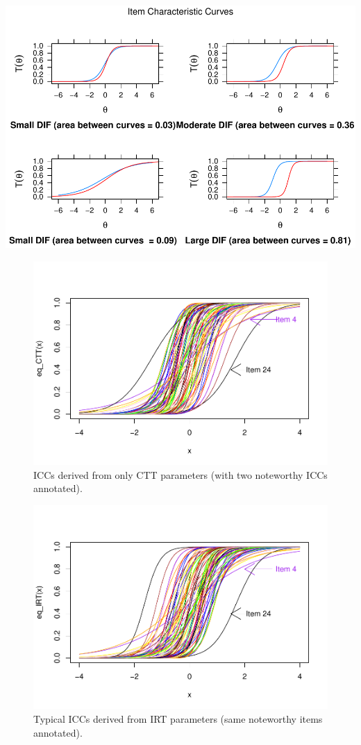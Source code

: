 \documentclass[
  english,
  man]{apa6}
\begin{document}
\includegraphics{ICC_project_files/figure-latex/plotting-1.pdf}

\begin{figure}
\centering
\includegraphics{ICC_project_files/figure-latex/AUC-1.pdf}
\caption{\label{fig:AUC}ICCs derived from only CTT parameters (with two noteworthy ICCs annotated).}
\end{figure}

\begin{figure}
\centering
\includegraphics{ICC_project_files/figure-latex/irtcurves-1.pdf}
\caption{\label{fig:irtcurves}Typical ICCs derived from IRT parameters (same noteworthy items annotated).}
\end{figure}
\end{document}

